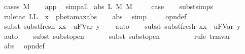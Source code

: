 \begin{isabellebody}
\ {\isacharparenleft}cases\ M{\isacharparenright}\isanewline
\ \ \isamarkupfalse%
\ app\ \isamarkupfalse%
\ simp{\isacharunderscore}all\isanewline
{}\isamarkupfalse%
\isanewline
{}\isamarkupfalse%
\ {\isacharparenleft}abs\ L\ M\ M{\isacharprime}{\isacharparenright}\ \isanewline
\ \ \isamarkupfalse%
\ {\isacharquery}case\isanewline
\ \ \isamarkupfalse%
\ subst{\isachardot}simps\isanewline
\ \ \isamarkupfalse%
\ {\isacharparenleft}rule{\isacharunderscore}tac\ L{\isacharequal}{\isachardoublequoteopen}L\ {\isasymunion}\ {\isacharbraceleft}x{\isacharbraceright}{\isachardoublequoteclose}\ \ pbeta{\isacharunderscore}max{\isachardot}abs{\isacharparenright}\isanewline
\ \ \isamarkupfalse%
\ abs\ \isamarkupfalse%
\ simp\ \isanewline
\ \ \isamarkupfalse%
\ opn{\isacharprime}{\isacharunderscore}def\isanewline
\ \ \isamarkupfalse%
\ {\isacharparenleft}subst\ subst{\isacharunderscore}fresh{}{\isacharbrackleft}\ x{\isacharequal}x\ \ u{\isacharequal}{\isachardoublequoteopen}FVar\ y{\isachardoublequoteclose}{\isacharbrackright}{\isacharparenright}\isanewline
\ \ \isamarkupfalse%
\ auto{\isacharbrackleft}{}{\isacharbrackright}\isanewline
\ \ \isamarkupfalse%
\ {\isacharparenleft}subst{\isacharparenleft}{}{\isacharparenright}\ subst{\isacharunderscore}fresh{}{\isacharbrackleft}\ x{\isacharequal}x\ \ u{\isacharequal}{\isachardoublequoteopen}FVar\ y{\isachardoublequoteclose}{\isacharbrackright}{\isacharparenright}\isanewline
\ \ \isamarkupfalse%
\ auto{\isacharbrackleft}{}{\isacharbrackright}\isanewline
\ \ \isamarkupfalse%
\ {\isacharparenleft}subst\ subst{\isacharunderscore}open{}{\isacharparenright}\isanewline
\ \ \isamarkupfalse%
\isanewline
\ \ \isamarkupfalse%
\ {\isacharparenleft}subst\ subst{\isacharunderscore}open{}{\isacharparenright}\isanewline
\ \ \isamarkupfalse%
\isanewline
\ \ \isamarkupfalse%
\isanewline
\ \ \isamarkupfalse%
\ {\isacharparenleft}rule\ trm{\isachardot}var{\isacharparenright}\isanewline
\ \ \isamarkupfalse%
\ abs\ \isamarkupfalse%
\ opn{\isacharprime}{\isacharunderscore}def\isanewline
\ \ \isamarkupfalse%

\end{isabellebody}
